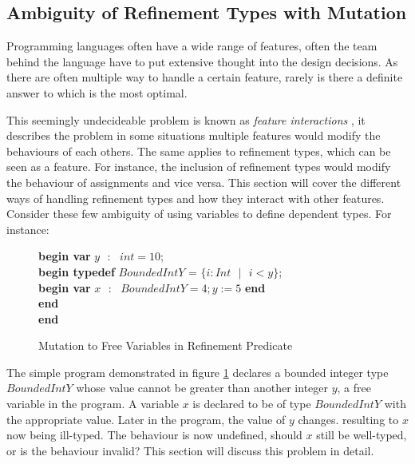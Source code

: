 \documentclass[a4paper,12pt]{report}
\newenvironment{tabs}[1]
 {\flushleft\TabPositions{#1}}
 {\endflushleft}
\begin{document}
\subsection{Ambiguity of Refinement Types with Mutation}

Programming languages often have a wide range of features, often the team behind 
the language have to put extensive thought into the design decisions. As there 
are often multiple way to handle a certain feature, rarely is there a definite 
answer to which is the most optimal.

\par
This seemingly undecideable problem is known as \textit{feature interactions} 
\cite{featInteract}, it describes the problem in some situations multiple 
features would modify the behaviours of each others. The same applies to 
refinement types, which can be seen as a feature. For instance, the inclusion 
of refinement types would modify the behaviour of assignments and vice versa. 
This section will cover the different ways of handling refinement types and how 
they interact with other features.
Consider these few ambiguity of using variables to define dependent types. For 
instance: 

\begin{figure} [H]
  \begin{tabs}{1cm,2cm}
    \textbf{begin var }$y\text{ }:\text{ } int = 10;$ \\
    \tab\textbf{begin typedef }$BoundedIntY$ = $\{i : Int\text{ }|\text{ } i < y\}$; \\ 
    \tab\tab\textbf{begin var }$x\text{ }:\text{ }BoundedIntY = 4;y := 5$\textbf { end} \\
    \tab\textbf {end} \\
    \textbf{end}
  \end{tabs}  
  \caption{Mutation to Free Variables in Refinement Predicate}
  \label{fig:amb_refinement_vars}
\end{figure}

\par
The simple program demonstrated in figure \ref{fig:amb_refinement_vars} declares a 
bounded integer type $BoundedIntY$ whose value cannot be greater than another integer $y$, 
a free variable in the program. A variable $x$ is declared to be of type 
$BoundedIntY$ with the appropriate value. Later in the program, the value of $y$ 
changes. resulting to $x$ now being ill-typed. The behaviour is now undefined, 
should $x$ still be well-typed, or is the behaviour invalid? This section will 
discuss this problem in detail. 
\end{document}
